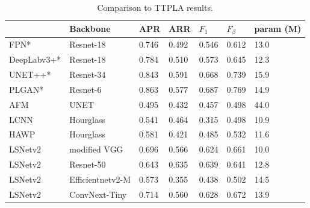 \documentclass[journal]{IEEEtran}
\begin{document}
\begin{table}[]
\begin{tabular}{l|l|llll|l}
            & Backbone         & APR   & ARR   & $F_1$ & $F_{\beta}$ & param (M) \\ \hline
FPN*        & Resnet-18        & 0.746 & 0.492 & 0.546 & 0.612       & 13.0      \\
DeepLabv3+* & Resnet-18        & 0.784 & 0.510 & 0.573 & 0.645       & 12.3      \\
UNET++*     & Resnet-34        & 0.843 & 0.591 & 0.668 & 0.739       & 15.9      \\
PLGAN*      & Resnet-6         & 0.863 & 0.577 & 0.687 & 0.769       & 14.9      \\ \hline
AFM         & UNET             & 0.495 & 0.432 & 0.457 & 0.498       & 44.0      \\
LCNN        & Hourglass        & 0.541 & 0.464 & 0.315 & 0.498       & 10.9      \\
HAWP        & Hourglass        & 0.581 & 0.421 & 0.485 & 0.532       & 11.6      \\ \hline
LSNetv2     & modified VGG     & 0.696 & 0.566 & 0.624 & 0.661       & 10.0      \\
LSNetv2     & Resnet-50        & 0.643 & 0.635 & 0.639 & 0.641       & 12.8      \\
LSNetv2     & Efficientnetv2-M & 0.573 & 0.355 & 0.438 & 0.502       & 14.5      \\
LSNetv2     & ConvNext-Tiny    & 0.714 & 0.560 & 0.628 & 0.672       & 13.9     
\end{tabular}
\caption{\label{ttpla_table} Comparison to TTPLA results.}
\end{table}
\end{document}
